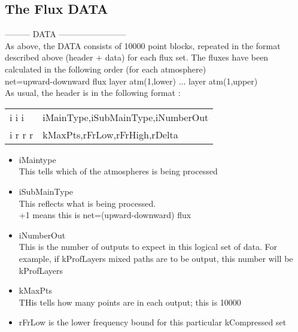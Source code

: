 \documentclass[12pt]{article}
\newlength{\colwidth}
\begin{document}
{{{{\subsection{ The Flux DATA}
--------- DATA ------------------------\\

As above, the DATA consists of 10000 point blocks, repeated in the 
format described above (header + data) for each flux set. The fluxes 
have been calculated in the following order (for each atmosphere)\\

\indent  net=upward-downward flux    layer atm(1,lower) ...  layer atm(1,upper)\\

As usual, the header is in the following format : 
\begin{longtable}{lp{\colwidth}}
{\sf i i i}    & iMainType,iSubMainType,iNumberOut\\
{\sf i r r r } & kMaxPts,rFrLow,rFrHigh,rDelta \\
\end{longtable}

\begin{itemize}
\item iMaintype\\
      This tells which of the atmospheres is being processed\\

\item iSubMainType \\
      This reflects what is being processed. \\
      +1 means this is net=(upward-downward) flux \\

\item iNumberOut\\
      This is the number of outputs to expect in this logical set of data. 
      For example, if kProfLayers mixed paths are to be output, this number 
      will be kProfLayers\\      

\item kMaxPts\\
      THis tells how many points are in each output; this is 10000\\

\item rFrLow is the lower frequency bound for this particular kCompressed set\\


\end{itemize}}}}}
\end{document}
